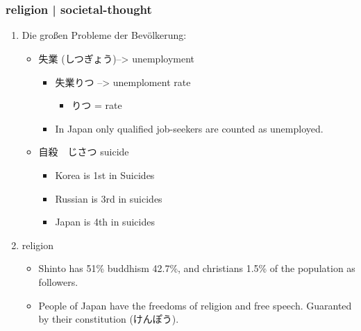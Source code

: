 \documentclass{article}
\newcommand\tabni[1][0.2cm]{\hspace*{#1}}
\begin{document}

\tableofcontents
\newpage

\part{}
\section{ \tabni religion |  \tabni societal-thought }
\begin{enumerate}[itemsep=-6pt]\setlength\itemsep{-0.4em}
\item Die großen Probleme der Bevölkerung: 
\begin{itemize}%
\item 失業 (しつぎょう)--> unemployment
\begin{itemize}
\item 失業りつ --> unemploment rate
\begin{itemize}%
\item りつ = rate
\end{itemize}
\item In Japan only qualified job-seekers are counted as unemployed.
\end{itemize}
\item 自殺　じさつ suicide
\begin{itemize}%
\item Korea is 1st in Suicides
\item Russian is 3rd in suicides
\item Japan is 4th in suicides \\
\end{itemize}
\end{itemize}
\item {} \tabni religion
\begin{itemize}%
\item Shinto has 51\% buddhism 42.7\%, and christians 1.5\% of the population as followers.
\item People of Japan have the freedoms of religion and free speech. Guaranted by their constitution (けんぽう). \\

\end{itemize}
\end{enumerate}
\end{document}
